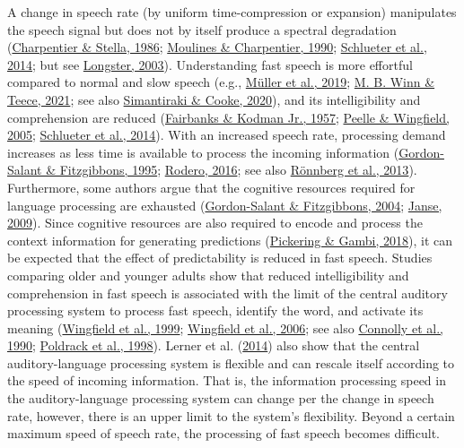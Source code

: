 \documentclass[a4paper, nobind]{templates/ociamthesis}
\begin{document}
A change in speech rate (by uniform time-compression or expansion) manipulates the speech signal but does not by itself produce a spectral degradation (\protect\hyperlink{ref-Charpentier1986}{Charpentier \& Stella, 1986}; \protect\hyperlink{ref-Moulines1990}{Moulines \& Charpentier, 1990}; \protect\hyperlink{ref-Schlueter2014}{Schlueter et al., 2014}; but see \protect\hyperlink{ref-Longster2003}{Longster, 2003}).
Understanding fast speech is more effortful compared to normal and slow speech (e.g., \protect\hyperlink{ref-Mueller2019}{Müller et al., 2019}; \protect\hyperlink{ref-Winn2021}{M. B. Winn \& Teece, 2021}; see also \protect\hyperlink{ref-Simantiraki2020}{Simantiraki \& Cooke, 2020}),
and its intelligibility and comprehension are reduced (\protect\hyperlink{ref-Fairbanks1957}{Fairbanks \& Kodman Jr., 1957}; \protect\hyperlink{ref-Peelle2005}{Peelle \& Wingfield, 2005}; \protect\hyperlink{ref-Schlueter2014}{Schlueter et al., 2014}).
With an increased speech rate, processing demand increases as less time is available to process the incoming information (\protect\hyperlink{ref-Gordonsalant1995}{Gordon-Salant \& Fitzgibbons, 1995}; \protect\hyperlink{ref-Rodero2016}{Rodero, 2016}; see also \protect\hyperlink{ref-Roennberg2013}{Rönnberg et al., 2013}).
Furthermore, some authors argue that the cognitive resources required for language processing are exhausted (\protect\hyperlink{ref-Gordonsalant2004}{Gordon-Salant \& Fitzgibbons, 2004}; \protect\hyperlink{ref-Janse2009}{Janse, 2009}).
Since cognitive resources are also required to encode and process the context information for generating predictions (\protect\hyperlink{ref-Pickering2018}{Pickering \& Gambi, 2018}), it can be expected that the effect of predictability is reduced in fast speech.
Studies comparing older and younger adults show that reduced intelligibility and comprehension in fast speech is associated with the limit of the central auditory processing system to process fast speech, identify the word, and activate its meaning (\protect\hyperlink{ref-Wingfield1999}{Wingfield et al., 1999}; \protect\hyperlink{ref-Wingfield2006}{Wingfield et al., 2006}; see also \protect\hyperlink{ref-Connolly1990}{Connolly et al., 1990}; \protect\hyperlink{ref-Poldrack1998}{Poldrack et al., 1998}).
Lerner et al. (\protect\hyperlink{ref-Lerner2014}{2014}) also show that the central auditory-language processing system is flexible and can rescale itself according to the speed of incoming information.
That is, the information processing speed in the auditory-language processing system can change per the change in speech rate,
however, there is an upper limit to the system's flexibility.
Beyond a certain maximum speed of speech rate, the processing of fast speech becomes difficult.
\end{document}
